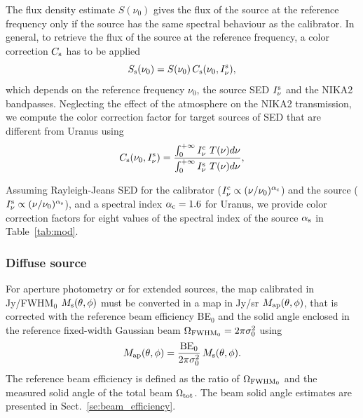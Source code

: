 The flux density estimate $S(\nu_{0})$ gives the
flux of the source at the reference frequency only if the source has
the same spectral behaviour as the calibrator. In general, to retrieve the
flux of the source at the reference frequency, a color correction
$C_{\rm{s}}$ has to be applied
\begin{equation}
S_{\rm{s}}(\nu_{0}) = S(\nu_{0}) \,  C_{\rm{s}}(\nu_{0}, I_\nu^{\rm{s}}),
\end{equation}
which depends on the reference frequency $\nu_{0}$, the source
SED $I_\nu^{\rm{s}}$ and the NIKA2 bandpasses.
Neglecting the effect of the atmosphere on the NIKA2 transmission, we
compute the color correction factor for target sources of SED that are
different from Uranus using
\begin{equation}
  C_{\rm{s}}(\nu_{0}, I_\nu^{\rm{s}}) = \frac{\int_{0}^{+\infty} I_\nu^{\rm{c}}~T({\nu}) d\nu}{ \int_{0}^{+\infty} I_\nu^{\rm{s}}~ T({\nu}) d\nu},
    \label{eq:color_correction}
\end{equation}

Assuming Rayleigh-Jeans SED for the calibrator
($I_\nu^{\rm{c}} \propto (\nu/\nu_0)^{\alpha_{\rm{c}}}$) and the source
($I_\nu^{\rm{s}} \propto (\nu/\nu_0)^{\alpha_{\rm{s}}}$), and a
spectral index $\alpha_{\rm{c}} = 1.6$ for Uranus, we provide color
correction factors for eight values of the spectral index of the
source $\alpha_{\rm{s}}$ in Table~\ref{tab:mod}.


\subsubsection{Diffuse source}
\label{se:extended_source_calib}

{\lp For aperture photometry or for extended sources, the map calibrated in
Jy/FWHM$_{0}$ $M_{\rm{s}}(\theta, \phi)$ must be converted in a
map in Jy/sr $M_{\rm{ap}}(\theta, \phi)$, that is corrected
with the reference beam efficiency BE$_{0}$ and the solid
angle enclosed in the reference fixed-width Gaussian beam
$\Omega_{\rm{FWHM}_{0}} = 2\pi \sigma_0^2$ using
\begin{equation}
M_{\rm{ap}}(\theta, \phi) = \frac{\rm{BE}_{0}}{2\pi \sigma_0^2} \, M_{\rm{s}}(\theta, \phi).
\end{equation}}
The reference beam efficiency is defined as the ratio of 
$\Omega_{\rm{FWHM}_{0}}$ and the measured solid angle of the total
beam $\Omega_{\rm{tot}}$.
The beam solid angle estimates are presented in
Sect.~\ref{se:beam_efficiency}.

